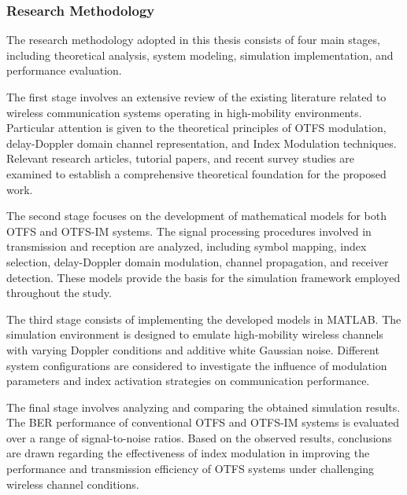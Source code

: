 \subsubsection{Research Methodology}

The research methodology adopted in this thesis consists of four main stages, including theoretical analysis, system modeling, simulation implementation, and performance evaluation.

The first stage involves an extensive review of the existing literature related to wireless communication systems operating in high-mobility environments. Particular attention is given to the theoretical principles of OTFS modulation, delay-Doppler domain channel representation, and Index Modulation techniques. Relevant research articles, tutorial papers, and recent survey studies are examined to establish a comprehensive theoretical foundation for the proposed work.

The second stage focuses on the development of mathematical models for both OTFS and OTFS-IM systems. The signal processing procedures involved in transmission and reception are analyzed, including symbol mapping, index selection, delay-Doppler domain modulation, channel propagation, and receiver detection. These models provide the basis for the simulation framework employed throughout the study.

The third stage consists of implementing the developed models in MATLAB. The simulation environment is designed to emulate high-mobility wireless channels with varying Doppler conditions and additive white Gaussian noise. Different system configurations are considered to investigate the influence of modulation parameters and index activation strategies on communication performance.

The final stage involves analyzing and comparing the obtained simulation results. The BER performance of conventional OTFS and OTFS-IM systems is evaluated over a range of signal-to-noise ratios. Based on the observed results, conclusions are drawn regarding the effectiveness of index modulation in improving the performance and transmission efficiency of OTFS systems under challenging wireless channel conditions.

